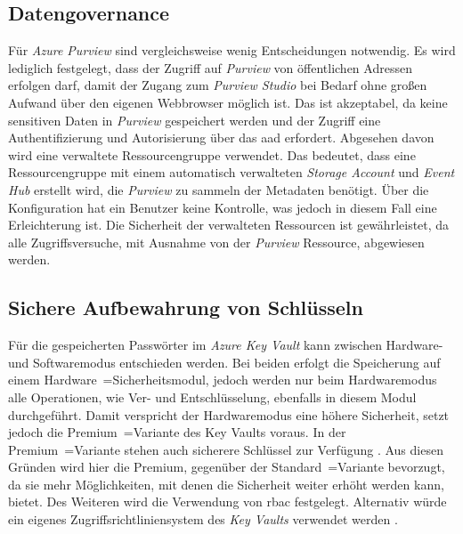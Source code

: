 \subsection{Datengovernance} \label{subsec:infra:konfig:purview}
Für \textit{Azure Purview} sind vergleichsweise wenig Entscheidungen notwendig. Es wird lediglich festgelegt, dass der Zugriff auf \textit{Purview} von öffentlichen Adressen erfolgen darf, damit der Zugang zum \textit{Purview Studio} bei Bedarf ohne großen Aufwand über den eigenen Webbrowser möglich ist. Das ist akzeptabel, da keine sensitiven Daten in \textit{Purview} gespeichert werden und der Zugriff eine Authentifizierung und Autorisierung über das \ac{aad} erfordert. Abgesehen davon wird eine verwaltete Ressourcengruppe verwendet. Das bedeutet, dass eine Ressourcengruppe mit einem automatisch verwalteten \textit{Storage Account} und \textit{Event Hub} erstellt wird, die \textit{Purview} zu sammeln der Metadaten benötigt. Über die Konfiguration hat ein Benutzer keine Kontrolle, was jedoch in diesem Fall eine Erleichterung ist. Die Sicherheit der verwalteten Ressourcen ist gewährleistet, da alle Zugriffsversuche, mit Ausnahme von der \textit{Purview} Ressource, abgewiesen werden. \cite[vgl.][]{msdoc_22_purviewDeploymentBestPract, msdoc_21_managedApps}

\subsection{Sichere Aufbewahrung von Schlüsseln} \label{subsec:infra:konfig:keyVault}
Für die gespeicherten Passwörter im \textit{Azure Key Vault} kann zwischen Hard\-ware- und Softwaremodus entschieden werden. Bei beiden erfolgt die Speicherung auf einem Hardware~=Sicherheitsmodul, jedoch werden nur beim Hardwaremodus alle Operationen, wie Ver- und Entschlüsselung, ebenfalls in diesem Modul durchgeführt. Damit verspricht der Hardwaremodus eine höhere Sicherheit, setzt jedoch die Premium~=Variante des Key Vaults voraus. In der Premium~=Variante stehen auch sicherere Schlüssel zur Verfügung \cite{haunts_key_2019}. Aus diesen Gründen wird hier die Premium, gegenüber der Standard~=Variante bevorzugt, da sie mehr Möglichkeiten, mit denen die Sicherheit weiter erhöht werden kann, bietet. Des Weiteren wird die Verwendung von \ac{rbac} festgelegt. Alternativ würde ein eigenes Zugriffsrichtliniensystem des \textit{Key Vaults} verwendet werden \cite[vgl.][]{herath_azure_2022}.

